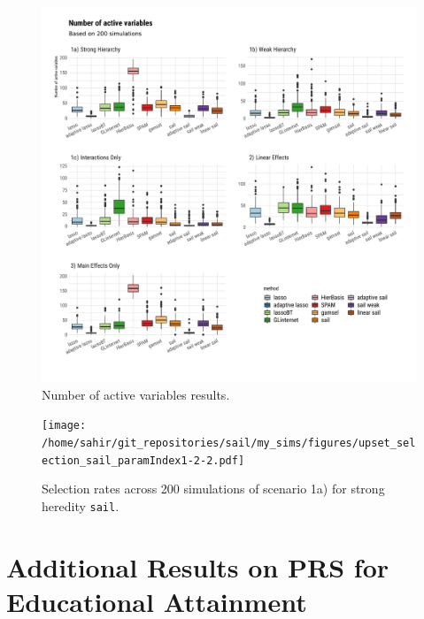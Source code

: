 \documentclass[12pt,letter]{article}\usepackage[]{graphicx}\usepackage[]{color}
\newenvironment{knitrout}{}{} %
\newcommand{\sail}{\texttt{sail}}
\begin{document}
\begin{knitrout}\scriptsize
{}\color{fgcolor}\begin{figure}[H]

{\centering \includegraphics[width=1\linewidth]{figure/plot-nactive-sim-1} 

}

\caption[Number of active variables results]{Number of active variables results.}\label{fig:plot-nactive-sim}
\end{figure}


\end{knitrout}


\begin{figure}[H]
	\centering
	\texttt{[image: /home/sahir/git\_repositories/sail/my\_sims/figures/upset\_selection\_sail\_paramIndex1-2-2.pdf]}
	\caption{Selection rates across 200 simulations of scenario 1a) for strong heredity \sail.}\label{fig:upset}
\end{figure}

\FloatBarrier


\section{Additional Results on PRS for Educational Attainment}
\end{document}
